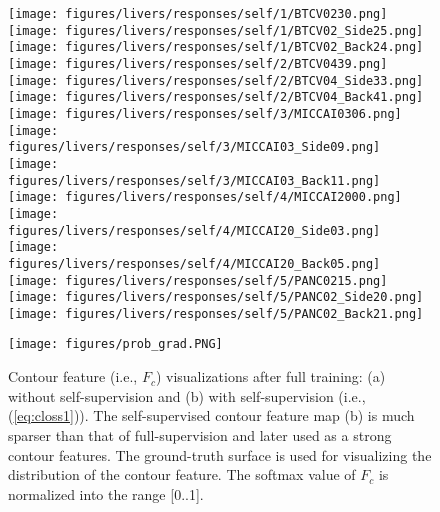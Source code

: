 \documentclass[journal]{IEEEtran}
\begin{document}
\begin{figure*}[tb]
\begin{minipage}[b]{3.5in}
        \end{minipage}
        \hfil
        \begin{minipage}[b]{3.5in}
            \centering
                \vfil
                \texttt{[image: figures/livers/responses/self/1/BTCV0230.png]}
                \texttt{[image: figures/livers/responses/self/1/BTCV02\_Side25.png]}
                \texttt{[image: figures/livers/responses/self/1/BTCV02\_Back24.png]}
                \vfil
                \texttt{[image: figures/livers/responses/self/2/BTCV0439.png]}
                \texttt{[image: figures/livers/responses/self/2/BTCV04\_Side33.png]}
                \texttt{[image: figures/livers/responses/self/2/BTCV04\_Back41.png]}
                \vfil
                \texttt{[image: figures/livers/responses/self/3/MICCAI0306.png]}
                \texttt{[image: figures/livers/responses/self/3/MICCAI03\_Side09.png]}
                \texttt{[image: figures/livers/responses/self/3/MICCAI03\_Back11.png]}
                \vfil
                \texttt{[image: figures/livers/responses/self/4/MICCAI2000.png]}
                \texttt{[image: figures/livers/responses/self/4/MICCAI20\_Side03.png]}
                \texttt{[image: figures/livers/responses/self/4/MICCAI20\_Back05.png]}
                \vfil
                \texttt{[image: figures/livers/responses/self/5/PANC0215.png]}
                \texttt{[image: figures/livers/responses/self/5/PANC02\_Side20.png]}
                \texttt{[image: figures/livers/responses/self/5/PANC02\_Back21.png]}
        \end{minipage}
        \vfil
       
        \texttt{[image: figures/prob\_grad.PNG]}
        
    \caption{Contour feature (i.e., $F_c$) visualizations after full training: (a) without self-supervision and (b) with self-supervision (i.e., (\ref{eq:closs1})). The self-supervised contour feature map (b) is much sparser than that of full-supervision and later used as a strong contour features. The ground-truth surface is used for visualizing the distribution of the contour feature. The softmax value of $F_c$ is normalized into the range [0..1].}
    \label{fig:responses}
\end{figure*}
\end{document}
